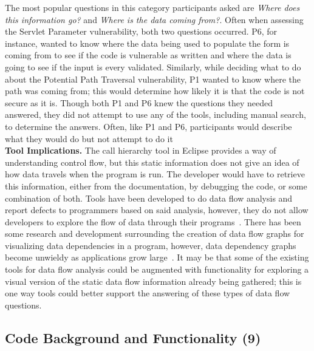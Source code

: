 \documentclass[conference]{IEEEtran}
\begin{document}
The most popular questions in this category participants asked are \textit{Where does this information go?} and  \textit{Where is the data coming from?}. 
Often when assessing the Servlet Parameter vulnerability, both two questions occurred. 
P6, for instance, wanted to know where the data being used to populate the form is coming from to see if the code is vulnerable as written and where the data is going to see if the input is every validated.  
Similarly, while deciding what to do about the Potential Path Traversal vulnerability, P1 wanted to know where the path was coming from; this would determine how likely it is that the code is not secure as it is.
Though both P1 and P6 knew the questions they needed answered, they did not attempt to use any of the tools, including manual search, to determine the answers. 
Often, like P1 and P6, participants would describe what they would do but not attempt to do it
\\

\noindent\textbf{Tool Implications.}
The call hierarchy tool in Eclipse provides a way of understanding control flow, but this static information does not give an idea of how data travels when the program is run. 
The developer would have to retrieve this information, either from the documentation, by debugging the code, or some combination of both. 
Tools have been developed to do data flow analysis and report defects to programmers based on said analysis, however, they do not allow developers to explore the flow of data through their programs~\cite{jovanovic2006pixy}. 
There has been some research and development surrounding the creation of data flow graphs for visualizing data dependencies in a program, however, data dependency graphs become unwieldy as applications grow large~\cite{ghosh2001method, ferrante1987program}. 
It may be that some of the existing tools for data flow analysis could be augmented with functionality for exploring a visual version of the static data flow information already being gathered; this is one way tools could better support the answering of these types of data flow questions.




\noindent\subsection{\textbf{Code Background and Functionality (9)}}
\label{cbf}
\end{document}
